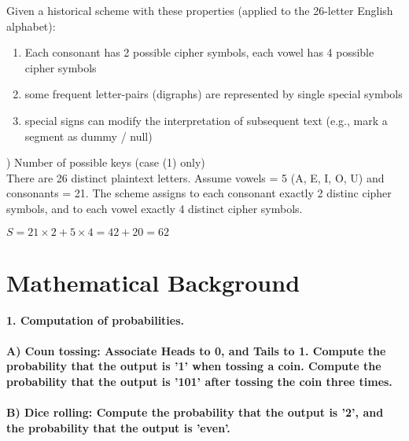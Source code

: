 \documentclass[]{article}
\numberwithin{figure}{section}
\begin{document}
Given a historical scheme with these properties (applied to the 26-letter English alphabet):

\begin{enumerate}
	\item Each consonant has 2 possible cipher symbols, each vowel has 4 possible cipher symbols
	\item some frequent letter-pairs (digraphs) are represented by single special symbols
	\item special signs can modify the interpretation of subsequent text (e.g., mark a segment as dummy / null)
\end{enumerate}

) Number of possible keys (case (1) only)\\
There are 26 distinct plaintext letters. Assume vowels = 5 (A, E, I, O, U) and consonants = 21. The scheme assigns to each consonant exactly 2 distinc cipher symbols, and to each vowel exactly 4 distinct cipher symbols. \\

\begin{center}
	$S = 21 \times 2 + 5 \times 4 = 42 + 20 = 62$
\end{center}







\newpage
\section{Mathematical Background}
\textbf{1. Computation of probabilities. \\ \\
	\indent A) Coun tossing: Associate Heads to 0, and Tails to 1. Compute the probability that the output is '1' when tossing a coin. Compute the probability that the output is '101' after tossing the coin three times. \\ \\
	\indent B) Dice rolling: Compute the probability that the output is '2', and the probability that the output is 'even'.}
	
\end{document}
